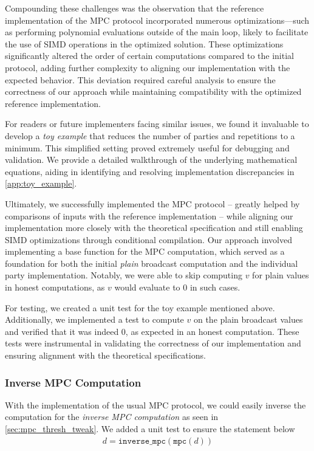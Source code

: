 \documentclass[11pt]{report}
\theoremstyle{definition}
\theoremstyle{plain}
\begin{document}
Compounding these challenges was the observation that the reference implementation of the MPC protocol incorporated numerous optimizations—such as performing polynomial evaluations outside of the main loop, likely to facilitate the use of SIMD operations in the optimized solution. These optimizations significantly altered the order of certain computations compared to the initial protocol, adding further complexity to aligning our implementation with the expected behavior. This deviation required careful analysis to ensure the correctness of our approach while maintaining compatibility with the optimized reference implementation.

For readers or future implementers facing similar issues, we found it invaluable to develop a \textit{toy example} that reduces the number of parties and repetitions to a minimum. This simplified setting proved extremely useful for debugging and validation. We provide a detailed walkthrough of the underlying mathematical equations, aiding in identifying and resolving implementation discrepancies in \autoref{app:toy_example}.

Ultimately, we successfully implemented the MPC protocol -- greatly helped by comparisons of inputs with the reference implementation -- while aligning our implementation more closely with the theoretical specification and still enabling SIMD optimizations through conditional compilation. Our approach involved implementing a base function for the MPC computation, which served as a foundation for both the initial \textit{plain} broadcast computation and the individual party implementation. Notably, we were able to skip computing $v$ for plain values in honest computations, as $v$ would evaluate to $0$ in such cases.

For testing, we created a unit test for the toy example mentioned above. Additionally, we implemented a test to compute $v$ on the plain broadcast values and verified that it was indeed $0$, as expected in an honest computation. These tests were instrumental in validating the correctness of our implementation and ensuring alignment with the theoretical specifications.

\subsubsection{Inverse MPC Computation}

With the implementation of the usual MPC protocol, we could easily inverse the computation for the \textit{inverse MPC computation} as seen in \autoref{sec:mpc_thresh_tweak}. We added a unit test to ensure the statement below
\begin{align*}
  d = \texttt{inverse\_mpc}(\texttt{mpc}(d))
\end{align*}
\end{document}
